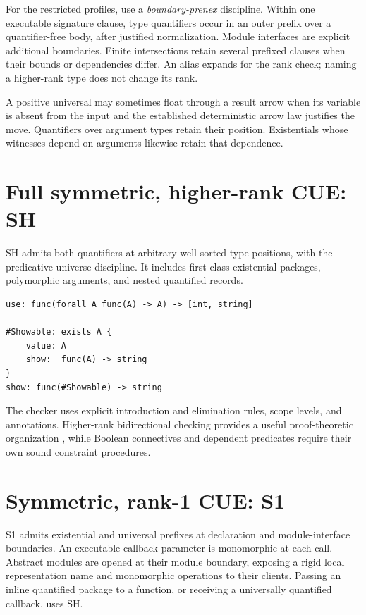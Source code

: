 \documentclass[11pt,a4paper,oneside]{report}
\newcommand{\Sone}{\ensuremath{\profilecal{S}_{1}}}
\newcommand{\Shigher}{\ensuremath{\profilecal{S}_{H}}}
\def\Sone{S1}%
\def\Shigher{SH}%
\theoremstyle{remark}
\begin{document}
For the restricted profiles, use a \emph{boundary-prenex} discipline. Within one
executable signature clause, type quantifiers occur in an outer prefix over a
quantifier-free body, after justified normalization. Module interfaces are
explicit additional boundaries. Finite intersections retain several prefixed
clauses when their bounds or dependencies differ. An alias expands for the rank
check; naming a higher-rank type does not change its rank.

A positive universal may sometimes float through a result arrow when its
variable is absent from the input and the established deterministic arrow law
justifies the move. Quantifiers over argument types retain their position.
Existentials whose witnesses depend on arguments likewise retain that dependence.

\section{Full symmetric, higher-rank CUE: \Shigher{}}
\Shigher{} admits both quantifiers at arbitrary well-sorted type positions, with the
predicative universe discipline. It includes first-class existential packages,
polymorphic arguments, and nested quantified records.
\par\noindent\begin{minipage}{\linewidth}
\begin{lstlisting}
use: func(forall A func(A) -> A) -> [int, string]

#Showable: exists A {
    value: A
    show:  func(A) -> string
}
show: func(#Showable) -> string
\end{lstlisting}
\end{minipage}\par
The checker uses explicit introduction and elimination rules, scope levels, and
annotations. Higher-rank bidirectional checking provides a useful proof-theoretic
organization \cite{dunfield}, while Boolean connectives and dependent predicates
require their own sound constraint procedures.

\section{Symmetric, rank-1 CUE: \Sone{}}
\Sone{} admits existential and universal prefixes at declaration and module-interface
boundaries. An executable callback parameter is monomorphic at each call.
Abstract modules are opened at their module boundary, exposing a rigid local
representation name and monomorphic operations to their clients. Passing an
inline quantified package to a function, or receiving a universally quantified
callback, uses \Shigher{}.
\end{document}
